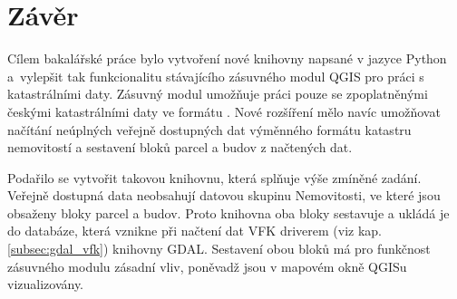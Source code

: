 \chapter{Závěr}
\label{5-zaver}

Cílem bakalářské práce bylo vytvoření nové knihovny napsané v jazyce
Python a~vylepšit tak funkcionalitu stávajícího zásuvného modul QGIS
pro práci s katastrálními daty. Zásuvný modul umožňuje práci
pouze se zpoplatněnými českými katastrálními daty ve formátu
. Nové rozšíření mělo navíc umožňovat načítání neúplných
veřejně dostupných dat výměnného formátu katastru nemovitostí a
sestavení bloků parcel a budov z načtených dat.

Podařilo se vytvořit takovou knihovnu, která
splňuje výše zmíněné zadání.
Veřejně dostupná data neobsahují datovou skupinu Nemovitosti, ve které
jsou obsaženy bloky parcel a budov. Proto knihovna oba bloky sestavuje
a ukládá je do databáze, která vznikne při načtení dat VFK driverem
(viz kap. \ref{subsec:gdal_vfk}) knihovny GDAL. Sestavení obou bloků
má pro funkčnost zásuvného modulu zásadní vliv, poněvadž jsou v
mapovém okně QGISu vizualizovány.

